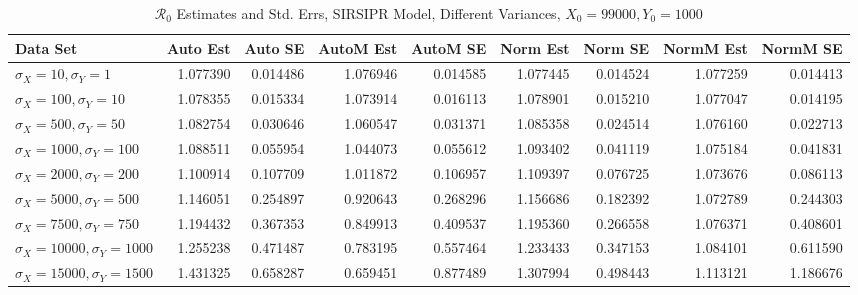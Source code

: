 \documentclass[12pt]{article}
\newcommand{\rr}{\ensuremath{\mathcal{R}_0}}
\begin{document}
\begin{table}[H]
	
	\caption{$\rr$ Estimates and Std. Errs, SIRSIPR Model,
		Different Variances, 
		$X_0 = 99000, Y_0 = 1000$}
	\begin{footnotesize}
		\hskip -1.7cm
		\begin{tabular}{l|r|r|r|r|r|r|r|r}
			\hline
			Data Set & Auto Est & Auto SE & AutoM Est & AutoM SE & Norm Est & Norm SE & NormM Est & NormM SE\\
			\hline
			$\sigma_X = 10, \sigma_Y = 1$ & 1.077390 & 0.014486 & 1.076946 & 0.014585 & 1.077445 & 0.014524 & 1.077259 & 0.014413\\
			\hline
			$\sigma_X = 100, \sigma_Y = 10$ & 1.078355 & 0.015334 & 1.073914 & 0.016113 & 1.078901 & 0.015210 & 1.077047 & 0.014195\\
			\hline
			$\sigma_X = 500, \sigma_Y = 50$ & 1.082754 & 0.030646 & 1.060547 & 0.031371 & 1.085358 & 0.024514 & 1.076160 & 0.022713\\
			\hline
			$\sigma_X = 1000, \sigma_Y = 100$ & 1.088511 & 0.055954 & 1.044073 & 0.055612 & 1.093402 & 0.041119 & 1.075184 & 0.041831\\
			\hline
			$\sigma_X = 2000, \sigma_Y = 200$ & 1.100914 & 0.107709 & 1.011872 & 0.106957 & 1.109397 & 0.076725 & 1.073676 & 0.086113\\
			\hline
			$\sigma_X = 5000, \sigma_Y = 500$ & 1.146051 & 0.254897 & 0.920643 & 0.268296 & 1.156686 & 0.182392 & 1.072789 & 0.244303\\
			\hline
			$\sigma_X = 7500, \sigma_Y = 750$ & 1.194432 & 0.367353 & 0.849913 & 0.409537 & 1.195360 & 0.266558 & 1.076371 & 0.408601\\
			\hline
			$\sigma_X = 10000, \sigma_Y = 1000$ & 1.255238 & 0.471487 & 0.783195 & 0.557464 & 1.233433 & 0.347153 & 1.084101 & 0.611590\\
			\hline
			$\sigma_X = 15000, \sigma_Y = 1500$ & 1.431325 & 0.658287 & 0.659451 & 0.877489 & 1.307994 & 0.498443 & 1.113121 & 1.186676\\
			\hline
		\end{tabular}
	\end{footnotesize}
\end{table}
\end{document}
